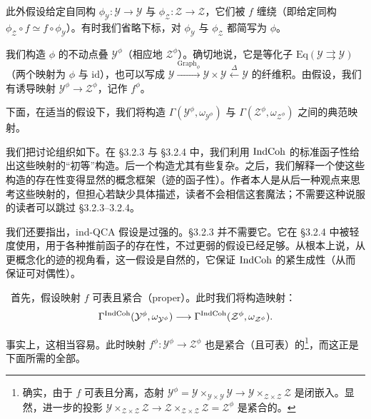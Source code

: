 
此外假设给定自同构 $\phi_{\mathcal{Y}} : \mathcal{Y} \to \mathcal{Y}$ 与 $\phi_{\mathcal{Z}} : \mathcal{Z} \to \mathcal{Z}$，它们被 $f$ 缠绕（即给定同构 $\phi_{\mathcal{Z}} \circ f \simeq f \circ \phi_{\mathcal{Y}}$）。有时我们省略下标，对 $\phi_{\mathcal{Y}}$ 与 $\phi_{\mathcal{Z}}$ 都简写为 $\phi$。

我们构造 $\phi$ 的不动点叠 $\mathcal{Y}^\phi$（相应地 $\mathcal{Z}^\phi$）。确切地说，它是等化子 $\mathrm{Eq}(\mathcal{Y} \rightrightarrows \mathcal{Y})$（两个映射为 $\phi$ 与 $\mathrm{id}$），也可以写成 $\mathcal{Y} \xrightarrow{\mathrm{Graph}_\phi} \mathcal{Y} \times \mathcal{Y} \xleftarrow{\Delta} \mathcal{Y}$ 的纤维积。由假设，我们有诱导映射 $\mathcal{Y}^\phi \to \mathcal{Z}^\phi$，记作 $f^\phi$。

下面，在适当的假设下，我们将构造 $\Gamma(\mathcal{Y}^\phi, \omega_{\mathcal{Y}^\phi})$ 与 $\Gamma(\mathcal{Z}^\phi, \omega_{\mathcal{Z}^\phi})$ 之间的典范映射。

我们把讨论组织如下。在 §3.2.3 与 §3.2.4 中，我们利用 $\mathrm{IndCoh}$ 的标准函子性给出这些映射的“初等”构造。后一个构造尤其有些复杂。之后，我们解释一个使这些构造的存在性变得显然的概念框架（迹的函子性）。作者本人是从后一种观点来思考这些映射的，但担心若缺少具体描述，读者不会相信这套魔法；不需要这种说服的读者可以跳过 §3.2.3--3.2.4。

我们还要指出，ind-QCA 假设是过强的。§3.2.3 并不需要它。它在 §3.2.4 中被轻度使用，用于各种推前函子的存在性，不过更弱的假设已经足够。从根本上说，从更概念化的迹的视角看，这一假设是自然的，它保证 $\mathrm{IndCoh}$ 的紧生成性（从而保证可对偶性）。

\ 首先，假设映射 $f$ 可表且紧合（proper）。此时我们将构造映射：
\begin{equation}
  \Gamma^{\mathrm{IndCoh}}(\mathcal{Y}^\phi, \omega_{\mathcal{Y}^\phi}) \longrightarrow
  \Gamma^{\mathrm{IndCoh}}(\mathcal{Z}^\phi, \omega_{\mathcal{Z}^\phi}).
\end{equation}

事实上，这相当容易。此时映射 $f^\phi : \mathcal{Y}^\phi \to \mathcal{Z}^\phi$ 也是紧合（且可表）的\footnote{确实，由于 $f$ 可表且分离，态射 $\mathcal{Y}^\phi = \mathcal{Y} \times_{\mathcal{Y} \times \mathcal{Y}} \mathcal{Y} \to \mathcal{Y} \times_{\mathcal{Z} \times \mathcal{Z}} \mathcal{Z}$ 是闭嵌入。显然，进一步的投影 $\mathcal{Y} \times_{\mathcal{Z} \times \mathcal{Z}} \mathcal{Z} \to \mathcal{Z} \times_{\mathcal{Z} \times \mathcal{Z}} \mathcal{Z} = \mathcal{Z}^\phi$ 是紧合的。}，而这正是下面所需的全部。

